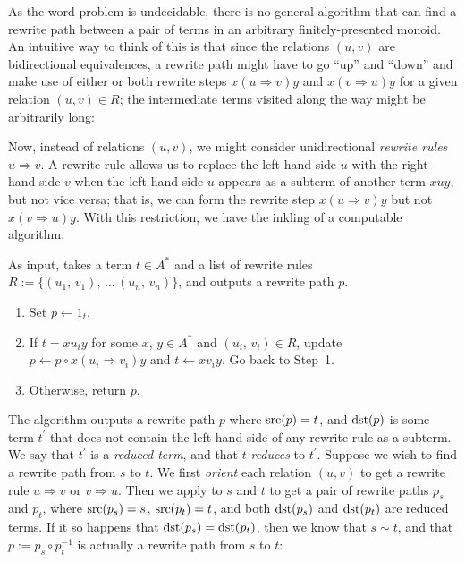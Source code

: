 \documentclass[../generics]{subfiles}
\begin{document}
As the word problem is undecidable, there is no general algorithm that can find a rewrite path between a pair of terms in an arbitrary finitely-presented monoid. An intuitive way to think of this is that since the relations $(u, v)$ are bidirectional equivalences, a rewrite path might have to go ``up'' and ``down'' and make use of either or both rewrite steps $x(u\Rightarrow v)y$ and $x(v\Rightarrow u)y$ for a given relation $(u, v)\in R$; the intermediate terms visited along the way might be arbitrarily long:
\begin{quote}
\end{quote}
Now, instead of relations $(u,v)$, we might consider unidirectional \emph{rewrite rules} $u\Rightarrow v$. A rewrite rule allows us to replace the left hand side $u$ with the right-hand side $v$ when the left-hand side $u$ appears as a subterm of another term $xuy$, but not vice versa; that is, we can form the rewrite step $x(u\Rightarrow v)y$ but not $x(v\Rightarrow u)y$. With this restriction, we have the inkling of a computable algorithm.
\begin{algorithm}\label{term reduction algo}
As input, takes a term $t\in A^*$ and a list of rewrite rules $R:=\{(u_1,\,v_1),\,\ldots\,(u_n,\,v_n)\}$, and outputs a rewrite path $p$.
\begin{enumerate}
\item Set $p\leftarrow 1_t$.
\item If $t=xu_iy$ for some $x$, $y\in A^*$ and $(u_i,\,v_i)\in R$, update $p\leftarrow p\circ x(u_i\Rightarrow v_i)y$ and $t\leftarrow xv_iy$. Go back to Step~1.
\item Otherwise, return $p$.
\end{enumerate}
\end{algorithm}
The algorithm outputs a rewrite path $p$ where $\operatorname{src}(p)=t$, and $\operatorname{dst}(p)$ is some term $t^\prime$ that does not contain the left-hand side of any rewrite rule as a subterm. We say that $t^\prime$ is a \emph{reduced term}, and that $t$ \emph{reduces} to $t^\prime$. Suppose we wish to find a rewrite path from $s$ to $t$. We first \emph{orient} each relation $(u, v)$ to get a rewrite rule $u\Rightarrow v$ or $v\Rightarrow u$. Then we apply  to $s$ and $t$ to get a pair of rewrite paths $p_s$ and $p_t$, where $\operatorname{src}(p_s)=s$, $\operatorname{src}(p_t)=t$, and both $\operatorname{dst}(p_s)$ and $\operatorname{dst}(p_t)$ are reduced terms. If it so happens that $\operatorname{dst}(p_s)=\operatorname{dst}(p_t)$, then we know that $s\sim t$, and that $p:= p_s \circ p_t^{-1}$ is actually a rewrite path from $s$ to $t$:
\end{document}
